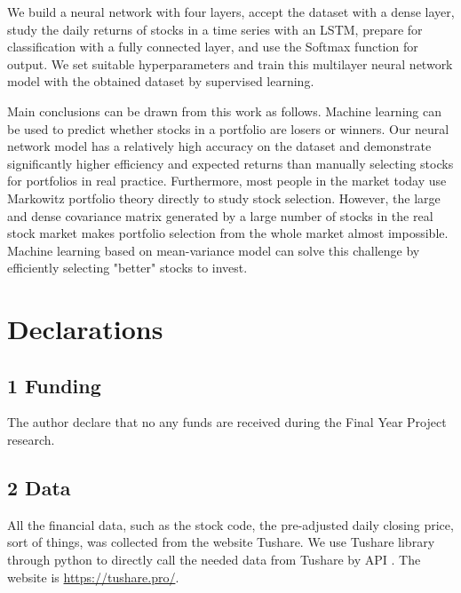 \documentclass[default,iicol]{sn-jnl}%
\begin{document}
We build a neural network with four layers, accept the dataset with a dense layer, study the daily returns of stocks in a time series with an LSTM, prepare for classification with a fully connected layer, and use the Softmax function for output. We set suitable hyperparameters and train this multilayer neural network model with the obtained dataset by supervised learning.

Main conclusions can be drawn from this work as follows. Machine learning can be used to predict whether stocks in a portfolio are losers or winners. Our neural network model has a relatively high accuracy on the dataset and demonstrate significantly higher efficiency and expected returns than manually selecting stocks for portfolios in real practice. Furthermore, most people in the market today use Markowitz portfolio theory directly to study stock selection. However, the large and dense covariance matrix generated by a large number of stocks in the real stock market makes portfolio selection from the whole market almost impossible. Machine learning based on mean-variance model can solve this challenge by efficiently selecting "better" stocks to invest.
\clearpage
\onecolumn
\backmatter
\section*{Declarations}\label{sec9}

\subsection*{1 Funding}\label{sec9sub1}
The author declare that no any funds are received during the Final Year Project research.

\subsection*{2 Data}\label{sec9sub2}
All the financial data, such as the stock code, the pre-adjusted daily closing price, sort of things, was collected from the website Tushare. We use Tushare library through python to directly call the needed data from Tushare by API . The website is \url{https://tushare.pro/}.

\noindent
\bigskip
\end{document}
